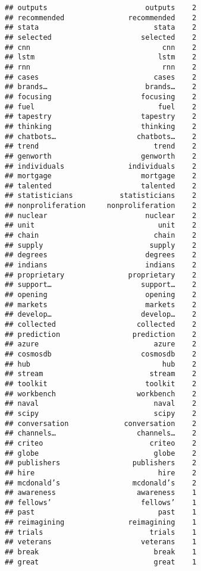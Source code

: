 \documentclass[]{article}
\begin{document}
\begin{verbatim}
## outputs                       outputs    2
## recommended               recommended    2
## stata                           stata    2
## selected                     selected    2
## cnn                               cnn    2
## lstm                             lstm    2
## rnn                               rnn    2
## cases                           cases    2
## brands…                       brands…    2
## focusing                     focusing    2
## fuel                             fuel    2
## tapestry                     tapestry    2
## thinking                     thinking    2
## chatbots…                   chatbots…    2
## trend                           trend    2
## genworth                     genworth    2
## individuals               individuals    2
## mortgage                     mortgage    2
## talented                     talented    2
## statisticians           statisticians    2
## nonproliferation     nonproliferation    2
## nuclear                       nuclear    2
## unit                             unit    2
## chain                           chain    2
## supply                         supply    2
## degrees                       degrees    2
## indians                       indians    2
## proprietary               proprietary    2
## support…                     support…    2
## opening                       opening    2
## markets                       markets    2
## develop…                     develop…    2
## collected                   collected    2
## prediction                 prediction    2
## azure                           azure    2
## cosmosdb                     cosmosdb    2
## hub                               hub    2
## stream                         stream    2
## toolkit                       toolkit    2
## workbench                   workbench    2
## naval                           naval    2
## scipy                           scipy    2
## conversation             conversation    2
## channels…                   channels…    2
## criteo                         criteo    2
## globe                           globe    2
## publishers                 publishers    2
## hire                             hire    2
## mcdonald’s                 mcdonald’s    2
## awareness                   awareness    1
## fellows’                     fellows’    1
## past                             past    1
## reimagining               reimagining    1
## trials                         trials    1
## veterans                     veterans    1
## break                           break    1
## great                           great    1

\end{verbatim}
\end{document}
